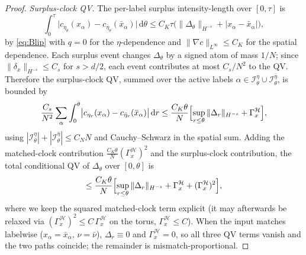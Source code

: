\documentclass[a4paper,fleqn]{cas-sc}
\theoremstyle{definition}
\theoremstyle{remark}
\begin{document}
\begin{proof}
\emph{Surplus-clock QV.} The per-label surplus intensity-length over
$[0,\tau]$ is
\[
\int_0^\tau\bigl|c_{\eta_\theta}(x_\alpha)-c_{\bar\eta_\theta}(\bar x_\alpha)\bigr|\,\mathrm d\theta
\le C_K\tau\bigl(\|\Delta_\theta\|_{H^{-s}}+|x_\alpha-\bar x_\alpha|\bigr),
\]
by \eqref{eq:Blip} with $q=0$ for the $\eta$-dependence and
$\|\nabla c\|_{L^\infty}\le C_K$ for the spatial dependence. Each surplus event
changes $\Delta_\theta$ by a signed atom of mass $1/N$; since
$\|\delta_x\|_{H^{-s}}\le C_s$ for $s>d/2$, each event contributes at most
$C_s/N^2$ to the QV. Therefore the surplus-clock QV, summed over the active labels
$\alpha\in\mathcal I^\eta_\theta\cup\mathcal I^{\bar\eta}_\theta$, is bounded by
\[
\frac{C_s}{N^2}\sum_{\alpha}\int_0^\theta
\bigl|c_{\eta_r}(x_\alpha)-c_{\bar\eta_r}(\bar x_\alpha)\bigr|\,\mathrm dr
\le\frac{C_K\theta}{N}\Bigl[\sup_{r\le\theta}\|\Delta_r\|_{H^{-s}}+\Gamma_x^{\mathcal H}\Bigr],
\]
using $|\mathcal I^\eta_\theta|+|\mathcal I^{\bar\eta}_\theta|\le C_NN$ and
Cauchy--Schwarz in the spatial sum. Adding the matched-clock contribution
$\frac{C_K\theta}{N}(\Gamma_x^{\mathcal H})^2$ and the surplus-clock contribution,
the total conditional QV of $\Delta_\theta$ over $[0,\theta]$ is
\begin{equation}\label{eq:QV-total}
\le\frac{C_K\theta}{N}\Bigl[\sup_{r\le\theta}\|\Delta_r\|_{H^{-s}}
+\Gamma_x^{\mathcal H}+(\Gamma_x^{\mathcal H})^2\Bigr],
\end{equation}
where we keep the squared matched-clock term explicit (it may afterwards be
relaxed via $(\Gamma_x^{\mathcal H})^2\le C\,\Gamma_x^{\mathcal H}$ on the torus,
$\Gamma_x^{\mathcal H}\le C$).
When the input matches labelwise ($x_\alpha=\bar x_\alpha$, $\nu=\bar\nu$),
$\Delta_r\equiv0$ and $\Gamma_x^{\mathcal H}=0$, so all three QV terms vanish and the
two paths coincide; the remainder is mismatch-proportional.


\end{proof}
\end{document}
